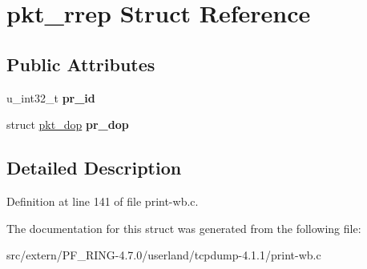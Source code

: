 \hypertarget{structpkt__rrep}{
\section{pkt\_\-rrep Struct Reference}
\label{structpkt__rrep}
}
\subsection*{Public Attributes}
\begin{DoxyCompactItemize}
\item 
\hypertarget{structpkt__rrep_a9fb0e0798b4d3a6d3430e4c01d0df2c8}{
u\_\-int32\_\-t {\bfseries pr\_\-id}}
\label{structpkt__rrep_a9fb0e0798b4d3a6d3430e4c01d0df2c8}

\item 
\hypertarget{structpkt__rrep_a9f302e9f525e99c34a56696478827089}{
struct \hyperlink{structpkt__dop}{pkt\_\-dop} {\bfseries pr\_\-dop}}
\label{structpkt__rrep_a9f302e9f525e99c34a56696478827089}

\end{DoxyCompactItemize}


\subsection{Detailed Description}


Definition at line 141 of file print-\/wb.c.



The documentation for this struct was generated from the following file:\begin{DoxyCompactItemize}
\item 
src/extern/PF\_\-RING-\/4.7.0/userland/tcpdump-\/4.1.1/print-\/wb.c\end{DoxyCompactItemize}
